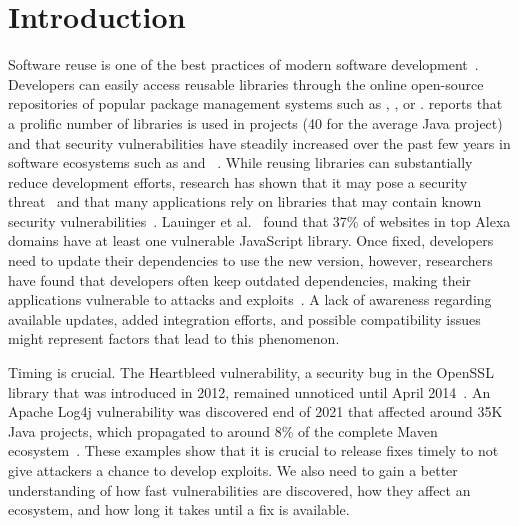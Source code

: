 \section{Introduction}
Software reuse is one of the best practices of modern software development~\cite{krueger1992software}.
Developers can easily access reusable libraries through the online open-source repositories of popular package management systems such as , , or .
 reports that a prolific number of libraries is used in projects (40 for the average Java project) and that security vulnerabilities have steadily increased over the past few years in software ecosystems such as  and ~\cite{snyk21}.
While reusing libraries can substantially reduce development efforts, research has shown that it may pose a security threat~\cite{pham2010detection} and that many applications rely on libraries that may contain known security vulnerabilities~\cite{cadariu2015tracking}.
Lauinger et al.~\cite{lauinger2018thou} found that 37\% of websites in top Alexa domains have at least one vulnerable JavaScript library.
Once fixed, developers need to update their dependencies to use the new version, however, researchers have found that developers often keep outdated dependencies, making their applications vulnerable to attacks and exploits~\cite{kula2018developers}.
A lack of awareness regarding available updates, added integration efforts, and possible compatibility issues might represent factors that lead to this phenomenon.

Timing is crucial.
The Heartbleed vulnerability, a security bug in the OpenSSL library that was introduced in 2012, remained unnoticed until April 2014~\cite{durumeric2014matter}.
An Apache Log4j vulnerability was discovered end of 2021 that affected around 35K Java projects, which propagated to around 8\% of the complete Maven ecosystem~\cite{log4jvul}. 
These examples show that it is crucial to release fixes timely to not give attackers a chance to develop exploits.
We also need to gain a better understanding of how fast vulnerabilities are discovered, how they affect an ecosystem, and how long it takes until a fix is available.

